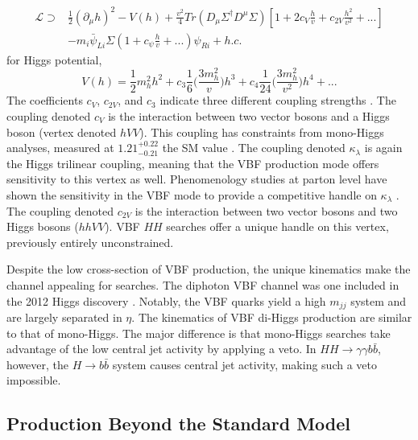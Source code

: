 \begin{equation}
    \begin{aligned}
    \mathcal{L} \supset &\frac{1}{2}(\partial_{\mu} h)^2 -V(h) + \frac{v^2}{4} Tr(D_{\mu}\Sigma^\dagger D^\mu \Sigma) [1 + 2c_{V} \frac{h}{v} + c_{2V} \frac{h^2}{v^2} + ...] \\
     &- m_i\bar{\psi}_{Li}\Sigma(1+c_{\psi}\frac{h}{v}+...)\psi_{Ri} + h.c.
    \end{aligned}
\end{equation}
for Higgs potential,
\begin{equation}
    V(h) = \frac{1}{2}m_h^2h^2 +c_3 \frac{1}{6}\bigg(\frac{3m_h^2}{v}\bigg)h^3 + c_4 \frac{1}{24}\bigg(\frac{3m_h^2}{v^2}\bigg)h^4+...
\end{equation}
The coefficients $c_V$, $c_{2V}$, and $c_3$ indicate three different coupling strengths \cite{vbfhh}. The coupling denoted $c_V$ is the interaction between two vector bosons and a Higgs boson (vertex denoted $hVV$). This coupling has constraints from mono-Higgs analyses, measured at $1.21^{+0.22}_{-0.21}$ the \gls{SM} value \cite{higgs-measurements}. The coupling denoted $\kappa_{\lambda}$ is again the Higgs trilinear coupling, meaning that the \gls{VBF} production mode offers sensitivity to this vertex as well. Phenomenology studies at parton level have shown the sensitivity in the \gls{VBF} mode to provide a competitive handle on $\kappa_{\lambda}$ \cite{vbf_lambda}. The coupling denoted $c_{2V}$ is the interaction between two vector bosons and two Higgs bosons ($hhVV$). \gls{VBF} $HH$ searches offer a unique handle on this vertex, previously entirely unconstrained.

Despite the low cross-section of \gls{VBF} production, the unique kinematics make the channel appealing for searches. The diphoton \gls{VBF} channel was one included in the 2012 Higgs discovery \cite{higgs-discovery-atlas}. Notably, the \gls{VBF} quarks yield a high $m_{jj}$ system and are largely separated in $\eta$. The kinematics of \gls{VBF} di-Higgs production are similar to that of mono-Higgs. The major difference is that mono-Higgs searches take advantage of the low central jet activity by applying a veto. In $HH \rightarrow \gamma \gamma b\bar{b}$, however, the $H \rightarrow b\bar{b}$ system causes central jet activity, making such a veto impossible.


\subsection{Production Beyond the Standard Model}

